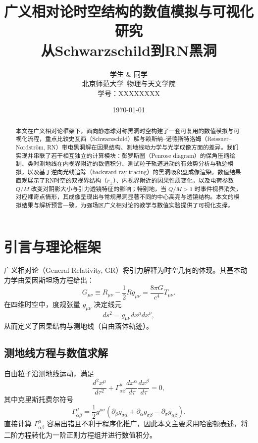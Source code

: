 \documentclass[a4paper,12pt]{article}
\title{\bfseries
广义相对论时空结构的数值模拟与可视化研究\\[0.3em]
\large 从Schwarzschild到RN黑洞}
\author{
学生 \& 同学\\
\small 北京师范大学\ 物理与天文学院\\
\small 学号：XXXXXXXX
}
\date{\small \today}
\numberwithin{equation}{section}
\begin{document}
\maketitle
\thispagestyle{empty}

\begin{abstract}
本文在广义相对论框架下，面向静态球对称黑洞时空构建了一套可复用的数值模拟与可视化流程，重点比较史瓦西（Schwarzschild）解与赖斯纳--诺德斯特洛姆（Reissner--Nordström, RN）带电黑洞解在因果结构、测地线动力学与光学成像方面的差异。我们实现并串联了若干相互独立的计算模块：彭罗斯图（Penrose diagram）的保角压缩绘制、类时测地线在内视界附近的数值积分、测试粒子轨道进动的有效势分析与轨迹模拟，以及基于逆向光线追踪（backward ray tracing）的黑洞吸积盘成像渲染。数值结果直观展示了RN时空的双视界结构（$r_\pm$）、内视界附近的因果性质变化，以及电荷参数 $Q/M$ 改变对阴影大小与引力透镜特征的影响；特别地，当 $Q/M>1$ 时事件视界消失，对应裸奇点情形，其成像呈现出与常规黑洞显著不同的中心高亮与透镜结构。本文的模拟结果与解析预言一致，为强场区广义相对论的教学与数值实验提供了可视化支撑。
\end{abstract}

\newpage
\tableofcontents
\newpage

\section{引言与理论框架}

广义相对论（General Relativity, GR）将引力解释为时空几何的体现。其基本动力学由爱因斯坦场方程给出：
\begin{equation}
G_{\mu\nu}\equiv R_{\mu\nu}-\frac{1}{2}Rg_{\mu\nu}=\frac{8\pi G}{c^4}T_{\mu\nu}.
\end{equation}
在四维时空中，度规张量 $g_{\mu\nu}$ 决定线元
\begin{equation}
ds^2=g_{\mu\nu}dx^\mu dx^\nu,
\end{equation}
从而定义了因果结构与测地线（自由落体轨迹）。

\subsection{测地线方程与数值求解}

自由粒子沿测地线运动，满足
\begin{equation}
\frac{d^2x^\mu}{d\tau^2}+\Gamma^\mu_{\alpha\beta}\frac{dx^\alpha}{d\tau}\frac{dx^\beta}{d\tau}=0,
\end{equation}
其中克里斯托费尔符号
\begin{equation}
\Gamma^\mu_{\alpha\beta}
=\frac{1}{2}g^{\mu\sigma}\left(\partial_\beta g_{\sigma\alpha}+\partial_\alpha g_{\sigma\beta}-\partial_\sigma g_{\alpha\beta}\right).
\end{equation}
直接计算 $\Gamma^\mu_{\alpha\beta}$ 容易出错且不利于程序化推广，因此本文主要采用哈密顿表述，将二阶方程转化为一阶正则方程组并进行数值积分。
\end{document}

